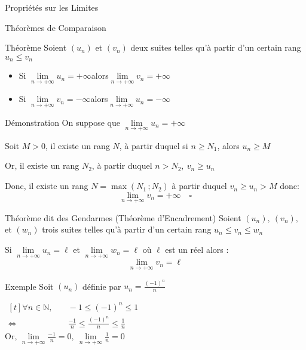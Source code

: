 \documentclass{cours}
\begin{document}
    \begin{Gpartie}{Propriétés sur les Limites} 
        \begin{Spartie}{Théorèmes de Comparaison} 
            \begin{SSpartie}{Théorème} 
                Soient $(u_n)$ et $(v_n)$ deux suites telles qu'à partir d'un certain rang $u_n\leq v_n$
                \begin{itemize}
                    \setlength\itemsep{0.5em}
                    \item Si $\lim\limits_{n\to +\infty}u_n=+\infty$\quad alors\quad $\lim\limits_{n\to +\infty}v_n=+\infty$
                    \item Si $\lim\limits_{n\to +\infty}v_n=-\infty$\quad alors\quad $\lim\limits_{n\to +\infty}u_n=-\infty$
                \end{itemize}
            \end{SSpartie}
            \begin{SSpartie}{Démonstration} 
                On suppose que $\lim\limits_{n\to +\infty}u_n=+\infty$

                Soit $M>0$, il existe un rang $N$, à partir duquel si $n\geq N_1$, alors $u_n\geq M$

                Or, il existe un rang $N_2$, à partir duquel $n>N_2,\ v_n\geq u_n$

                Donc, il existe un rang $N=\max(N_1\,;N_2)$ à partir duquel $v_n\geq u_n>M$ donc: \[\lim\limits_{n\to +\infty}v_n=+\infty\quad\square\]
            \end{SSpartie}
            \begin{SSpartie}{Théorème dit des Gendarmes (Théorème d'Encadrement)}
                Soient $(u_n),\ (v_n),$ et $(w_n)$ trois suites telles qu'à partir d'un certain rang $u_n\leq v_n\leq w_n$

                Si $\lim\limits_{n\to +\infty}u_n=\ell$ et $\lim\limits_{n\to +\infty}w_n=\ell$ où $\ell$ est un réel alors :
                \[\lim\limits_{n\to +\infty}v_n=\ell\]
            \end{SSpartie}
            \begin{SSpartie}{Exemple} 
                Soit $(u_n)$ définie par $u_n=\frac{(-1)^n}{n}$

                $\begin{aligned}[t]
                    \forall n\in\mathbb{N},&\quad-1\leq (-1)^n\leq 1 \\
                    \iff&\quad\frac{-1}{n}\leq\frac{(-1)^n}{n}\leq\frac{1}{n}
                \end{aligned}$ \\[2ex]
                Or, $\lim\limits_{n\to +\infty}\frac{-1}{n}=0,\ \lim\limits_{n\to +\infty}\frac{1}{n}=0$


\end{SSpartie}
\end{Spartie}
\end{Gpartie}
\end{document}
